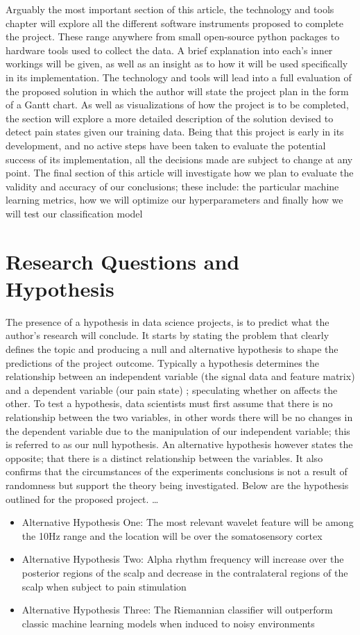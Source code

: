 \documentclass[12pt]{article}
\begin{document}
Arguably the most important section of this article, the technology and tools chapter will explore all the different software instruments proposed to complete the project. These range anywhere from small open-source python packages to hardware tools used to collect the data. A brief explanation into each’s inner workings will be given, as well as an insight as to how it will be used specifically in its implementation. The technology and tools will lead into a full evaluation of the proposed solution in which the author will state the project plan in the form of a Gantt chart. As well as visualizations of how the project is to be completed, the section will explore a more detailed description of the solution devised to detect pain states given our training data. Being that this project is early in its development, and no active steps have been taken to evaluate the potential success of its implementation, all the decisions made are subject to change at any point. 
The final section of this article will investigate how we plan to evaluate the validity and accuracy of our conclusions; these include: the particular machine learning metrics, how we will optimize our hyperparameters and finally how we will test our classification model

\section{Research Questions and Hypothesis}
The presence of a hypothesis in data science projects, is to predict what the author’s research will conclude. It starts by stating the problem that clearly defines the topic and producing a null and alternative hypothesis to shape the predictions of the project outcome. Typically a hypothesis determines the relationship between an independent variable (the signal data and feature matrix) and a dependent variable (our pain state) ; speculating whether on affects the other. To test a hypothesis, data scientists must first assume that there is no relationship between the two variables, in other words there will be no changes in the dependent variable due to the manipulation of our independent variable; this is referred to as our null hypothesis. An alternative hypothesis however states the opposite; that there is a distinct relationship between the variables. It also confirms that the circumstances of the experiments conclusions is not a result of randomness but support the theory being investigated. Below are the hypothesis outlined for the proposed project. 
\dots
\begin{itemize}
\item Alternative Hypothesis One: The most relevant wavelet feature will be among the 10Hz range and the location will be over the somatosensory cortex
\item Alternative Hypothesis Two: Alpha rhythm frequency will increase over the posterior regions of the scalp and decrease in the contralateral regions of the scalp when subject to pain stimulation
\item Alternative Hypothesis Three: The Riemannian classifier will outperform classic machine learning models when induced to noisy environments
\end{itemize}
\end{document}
